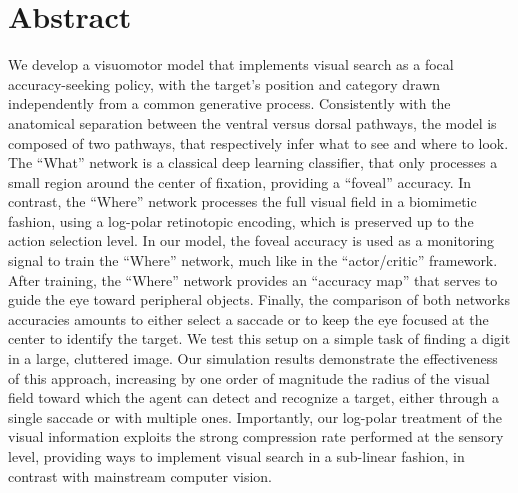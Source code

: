 \documentclass[10pt,a4paper]{article}
\begin{document}
\section*{Abstract}
We develop a visuomotor model that implements visual search as a focal accuracy-seeking policy, with the target's position and category drawn independently from a common generative process.  Consistently with the anatomical separation between the ventral versus dorsal pathways, the model is composed of two pathways, that respectively infer what to see and where to look. The ``What'' network is a classical deep learning classifier, that only processes a small region around the center of fixation, providing a ``foveal'' accuracy. In contrast, the ``Where'' network processes the full visual field in a biomimetic fashion, using a log-polar retinotopic encoding, which is preserved up to the action selection level. In our model, the foveal accuracy is used as a monitoring signal to train the ``Where'' network, much like in the ``actor/critic'' framework. After training, the ``Where'' network provides an ``accuracy map'' that serves to guide the eye toward peripheral objects. Finally, the comparison of both networks accuracies amounts to either select a saccade or to keep the eye focused at the center to identify the target. We test this setup on a simple task of finding a digit in a large, cluttered image.  Our simulation results demonstrate the effectiveness of this approach, increasing by one order of magnitude the radius of the visual field toward which the agent can detect and recognize a target, either through a single saccade or with multiple ones. Importantly, our log-polar treatment of the visual information exploits the strong compression rate performed at the sensory level, providing ways to implement visual search in a sub-linear fashion, in contrast with mainstream computer vision.










\nolinenumbers



\end{document}
